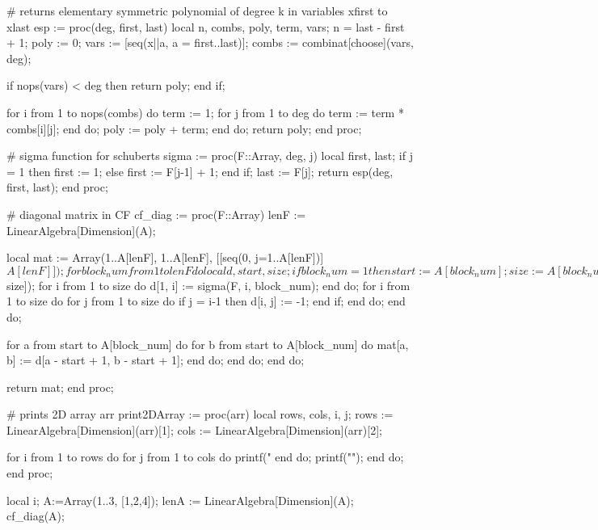 # returns elementary symmetric polynomial of degree k in variables xfirst to xlast
esp := proc(deg, first, last)
	local n, combs, poly, term, vars;
	n = last - first + 1;
	poly := 0;
	vars := [seq(x||a, a = first..last)];
	combs := combinat[choose](vars, deg);

	if nops(vars) < deg then
		return poly;
	end if;

		for i from 1 to nops(combs) do
			term := 1;
			for j from 1 to deg do
				term := term * combs[i][j];
			end do;
			poly := poly + term;
		end do;
	return poly;
end proc;

# sigma function for schuberts
sigma := proc(F::Array, deg, j)
	local first, last;
	if j = 1 then
		first := 1;
	else
		first := F[j-1] + 1;
	end if;
	last := F[j];
	return esp(deg, first, last);
end proc;

# diagonal matrix in CF
cf_diag := proc(F::Array)
	lenF := LinearAlgebra[Dimension](A);
	
	local mat := Array(1..A[lenF], 1..A[lenF], [[seq(0, j=1..A[lenF])] $ A[lenF]]);

	for block_num from 1 to lenF do
		local d, start, size;

		if block_num = 1 then
			start := A[block_num];
			size := A[block_num];
		else
			start := A[block_num - 1] + 1;
			size := A[block_num] - A[block_num - 1];
		end if;

		d := Array(1..size, 1..size, [[seq(0, j=1..size)] $ size]);
		for i from 1 to size do
			d[1, i] := sigma(F, i, block_num);
		end do;
		for i from 1 to size do
			for j from 1 to size do
				if j = i-1 then
					d[i, j] := -1;
				end if;
			end do;
		end do;

		for a from start to A[block_num] do
			for b from start to A[block_num] do
				mat[a, b] := d[a - start + 1, b - start + 1];
			end do;
		end do;
	end do;

	return mat;
end proc;


# prints 2D array arr
print2DArray := proc(arr)
    local rows, cols, i, j;
    rows := LinearAlgebra[Dimension](arr)[1];
    cols := LinearAlgebra[Dimension](arr)[2];

    for i from 1 to rows do
        for j from 1 to cols do
            printf("%
        end do;
        printf("\n");
    end do;
end proc;


local i;
A:=Array(1..3, [1,2,4]);
lenA := LinearAlgebra[Dimension](A);
cf_diag(A);
